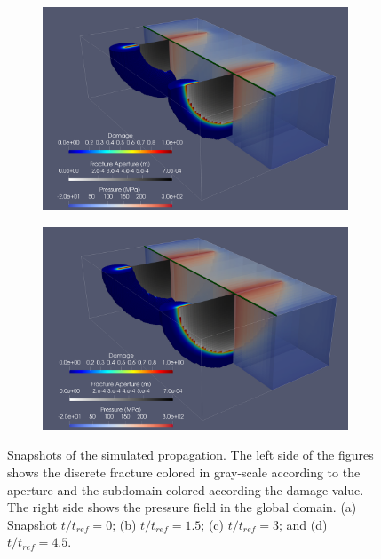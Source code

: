\begin{figure}[h]
\begin{subfigure}{.45\textwidth}
  \centering
  \includegraphics[width=\linewidth]{Chapter4/figures/3D/new_t_60.png}
  \caption{}
  \label{fig:parallel_t_2}
\end{subfigure}
\hspace{0.85cm}
\begin{subfigure}{.45\textwidth}
  \centering
  \includegraphics[width=\linewidth]{Chapter4/figures/3D/new_t_90.png}
  \caption{}
  \label{fig:parallel_t_3}
\end{subfigure}
  \caption{Snapshots of the simulated propagation. The left side of the figures shows the discrete fracture colored in gray-scale according to the aperture and the subdomain colored according the damage value. The right side shows the pressure field in the global domain. (a) Snapshot $t/t_{ref} = 0$; (b) $t/t_{ref} = 1.5$; (c) $t/t_{ref} = 3$; and (d) $t/t_{ref} = 4.5$. } 
  \label{fig:parallel_snapshots}
\end{figure}

